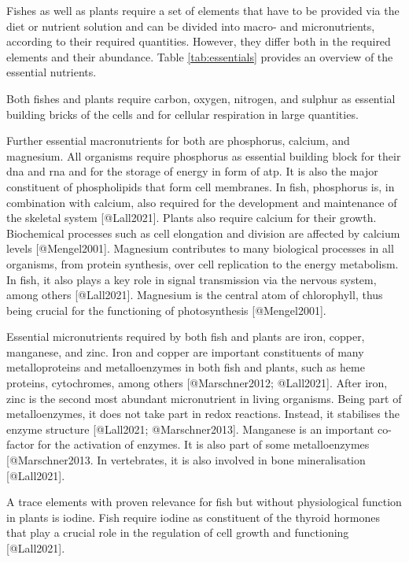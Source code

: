 Fishes as well as plants require a set of elements that have to be provided via the diet or nutrient solution and can be divided into macro- and micronutrients, according to their required quantities. However, they differ both in the required elements and their abundance. Table \ref{tab:essentials} provides an overview of the essential nutrients.

Both fishes and plants require carbon, oxygen, nitrogen, and sulphur as essential building bricks of the cells and for cellular respiration in large quantities. 

Further essential macronutrients for both are phosphorus, calcium, and magnesium. 
All organisms require phosphorus as essential building block for their \gls{dna} and \gls{rna} and for the storage of energy in form of \gls{atp}. It is also the major constituent of phospholipids that form cell membranes. In fish, phosphorus is, in combination with calcium, also required for the development and maintenance of the skeletal system [@Lall2021]. Plants also require calcium for their growth. Biochemical processes such as cell elongation and division are affected by calcium levels [@Mengel2001].
Magnesium contributes to many biological processes in all organisms, from protein synthesis, over cell replication to the energy metabolism. In fish, it also plays a key role in signal transmission via the nervous system, among others [@Lall2021]. Magnesium is the central atom of chlorophyll, thus being crucial for the functioning of photosynthesis [@Mengel2001].

Essential micronutrients required by both fish and plants are iron, copper, manganese, and zinc. 
Iron and copper are important constituents of many metalloproteins and metalloenzymes in both fish and plants, such as heme proteins, cytochromes, among others [@Marschner2012; @Lall2021]. After iron, zinc is the second most abundant micronutrient in living organisms. Being part of metalloenzymes, it does not take part in redox reactions. Instead, it stabilises the enzyme structure [@Lall2021; @Marschner2013]. Manganese is an important co-factor for the activation of enzymes. It is also part of some metalloenzymes [@Marschner2013. In vertebrates, it is also involved in bone mineralisation [@Lall2021]. 

A trace elements with proven relevance for fish but without physiological function in plants is iodine. Fish require iodine as constituent of the thyroid hormones that play a crucial role in the regulation of cell growth and functioning [@Lall2021].

